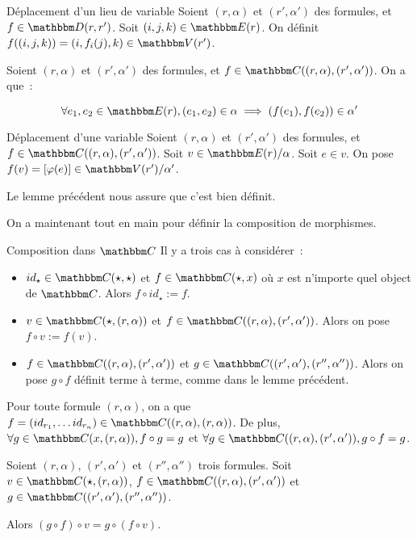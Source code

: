 \begin{defi}{Déplacement d'un lieu de variable}
    Soient $(r,\alpha)$ et $(r',\alpha')$ des formules, et $f\in\D(r,r')$.
    Soit $(i,j,k)\in\E(r)$. On définit $f((i,j,k)) = (i, f_i(j), k)\in\V(r')$.
\end{defi}

\begin{lem}
    Soient $(r,\alpha)$ et $(r',\alpha')$ des formules, et
    $f\in\C((r,\alpha),(r',\alpha'))$.
    On a que~:
    
    \[\forall e_1,e_2\in\E(r), (e_1,e_2)\in\alpha\implies (f(e_1),f(e_2))\in \alpha'\]
\end{lem}

\begin{defi}{Déplacement d'une variable}
    Soient $(r,\alpha)$ et $(r',\alpha')$ des formules, et
    $f\in\C((r,\alpha),(r',\alpha'))$.
    Soit $v\in\E(r)/\alpha$. Soit $e\in v$. On pose $f(v) = [\phi(e)]\in\V(r')/\alpha'$.

    Le lemme précédent nous assure que c'est bien définit.
\end{defi}

On a maintenant tout en main pour définir la composition de morphismes.

\begin{defi}{Composition dans $\C$}
    Il y a trois cas à considérer~:\begin{itemize}
        \item $id_\star\in\C(\star,\star)$ et $f\in\C(\star, x)$ où $x$ est n'importe
            quel object de $\C$. Alors $f\circ id_\star := f$.
        \item $v\in\C(\star, (r,\alpha))$ et $f\in\C((r,\alpha), (r',\alpha'))$. Alors
            on pose $f\circ v := f(v)$.
        \item $f\in\C((r,\alpha),(r',\alpha'))$ et $g\in\C((r',\alpha'),(r'',\alpha''))$.
            Alors on pose $g\circ f$ définit terme à terme, comme dans le lemme
            précédent.
    \end{itemize}
\end{defi}

\begin{lem}
    Pour toute formule $(r,\alpha)$, on a que
        $f=(id_{r_1},\dots id_{r_n})\in\C((r,\alpha),(r,\alpha))$.
    De plus, $\forall g\in\C(x, (r,\alpha)), f\circ g = g$
    et $\forall g\in\C((r,\alpha), (r',\alpha')), g\circ f = g$.
\end{lem}

\begin{lem}
    Soient $(r,\alpha)$, $(r',\alpha')$ et $(r'',\alpha'')$ trois formules.
    Soit $v\in\C(\star,(r,\alpha))$,
    $f\in\C((r,\alpha), (r',\alpha'))$ et $g\in\C((r',\alpha'), (r'',\alpha''))$.

    Alors $(g\circ f)\circ v = g\circ (f\circ v)$.
\end{lem}

